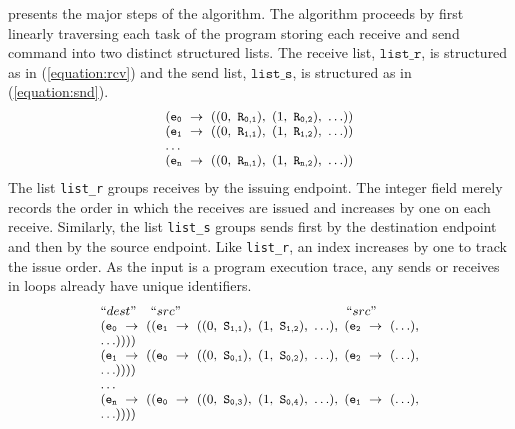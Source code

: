  presents the major steps of the algorithm. The algorithm proceeds by first linearly traversing each task of the program storing each receive and send command into two distinct structured lists. The receive list, $\mathtt{list\_r}$, is structured as in (\ref{equation:rcv}) and the send list, $\mathtt{list\_s}$, is structured as in (\ref{equation:snd}).
\begin{equation}
\footnotesize \begin{array}{l}
(\mathtt{e_0}\ \rightarrow\ ((0,\ \mathtt{R_{0,1}}),\ (1,\ \mathtt{R_{0,2}}),\ \ldots))\\
(\mathtt{e_1}\ \rightarrow\ ((0,\ \mathtt{R_{1,1}}),\ (1,\ \mathtt{R_{1,2}}),\ \ldots))\\
\ldots \\
(\mathtt{e_n}\ \rightarrow\ ((0,\ \mathtt{R_{n,1}}),\ (1,\ \mathtt{R_{n,2}}),\ \ldots))\\
\end{array}
\label{equation:rcv}
\end{equation}
The list \texttt{list\_r} groups receives by the issuing endpoint. The
integer field merely records the order in which the receives are
issued and increases by one on each receive. Similarly, the
list \texttt{list\_s} groups sends first by the destination endpoint
and then by the source endpoint. Like \texttt{list\_r}, an index
increases by one to track the issue order. As the input is a
program execution trace, any sends or receives in loops already have
unique identifiers.
\begin{equation}
\footnotesize \begin{array}{l}
 ``dest" \;\;\;\; ``src" \;\;\;\;\;\;\;\;\;\;\;\;\;\;\;\;\;\;\;\;\;\;\;\;\;\;\;\;\;\;\;\;\;\;\;\;\;\;\;\;\;\;\;\;\;\; ``src"\\
(\mathtt{e_0}\ \rightarrow\ ((\mathtt{e_1}\ \rightarrow\ ((0,\ \mathtt{S_{1,1}}),\ (1,\ \mathtt{S_{1,2}}),\ \ldots),\ (\mathtt{e_2}\ \rightarrow\ (\ldots),\\ \ldots))))\\
(\mathtt{e_1}\ \rightarrow\ ((\mathtt{e_0}\ \rightarrow\ ((0,\ \mathtt{S_{0,1}}),\ (1,\ \mathtt{S_{0,2}}),\ \ldots),\ (\mathtt{e_2}\ \rightarrow\ (\ldots),\\ \ldots))))\\
 \dots\\
(\mathtt{e_n}\ \rightarrow\ ((\mathtt{e_0}\ \rightarrow\ ((0,\ \mathtt{S_{0,3}}),\ (1,\ \mathtt{S_{0,4}}),\ \ldots),\ (\mathtt{e_1}\ \rightarrow\ (\ldots),\\ \ldots))))\\
\end{array}
\label{equation:snd}
\end{equation}

